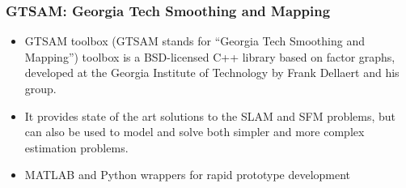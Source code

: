 \begin{frame}
    \frametitle{GTSAM: Georgia Tech Smoothing and Mapping}

    \begin{itemize}
        \item GTSAM toolbox (GTSAM stands for ``Georgia Tech Smoothing and Mapping'') toolbox is a BSD-licensed C++ library based on factor graphs, developed at the Georgia Institute of Technology by Frank Dellaert and his group.
        \item It provides state of the art solutions to the SLAM and SFM problems, but can also be used to model and solve both simpler and more complex estimation problems.
        \item MATLAB and Python wrappers for rapid prototype development
    \end{itemize}

\end{frame}

